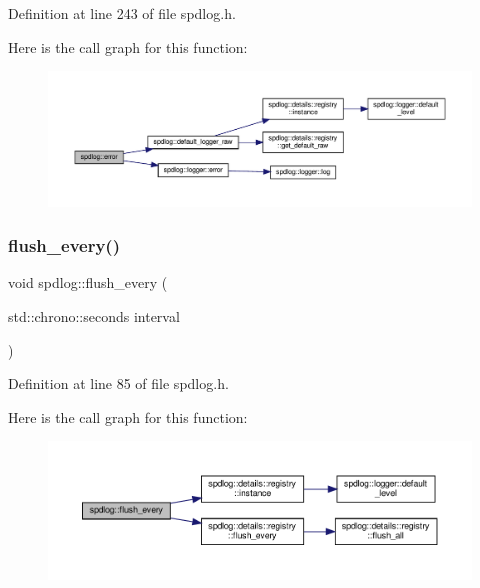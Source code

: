 Definition at line 243 of file spdlog.\+h.

Here is the call graph for this function\+:
\nopagebreak
\begin{figure}[H]
\begin{center}
\leavevmode
\includegraphics[width=350pt]{namespacespdlog_aa274f8a5f4f20ff435d27500ff589234_cgraph}
\end{center}
\end{figure}
\mbox{\label{namespacespdlog_a70d5763d644df282a67999baf4680dde}} 
\subsubsection{\texorpdfstring{flush\+\_\+every()}{flush\_every()}}
{\footnotesize\ttfamily void spdlog\+::flush\+\_\+every (\begin{DoxyParamCaption}\item[{std\+::chrono\+::seconds}]{interval }\end{DoxyParamCaption})\hspace{0.3cm}{\ttfamily [inline]}}



Definition at line 85 of file spdlog.\+h.

Here is the call graph for this function\+:
\nopagebreak
\begin{figure}[H]
\begin{center}
\leavevmode
\includegraphics[width=350pt]{namespacespdlog_a70d5763d644df282a67999baf4680dde_cgraph}
\end{center}
\end{figure}
\mbox{\label{namespacespdlog_afac55b239302064cba773add59b635d1}} 
